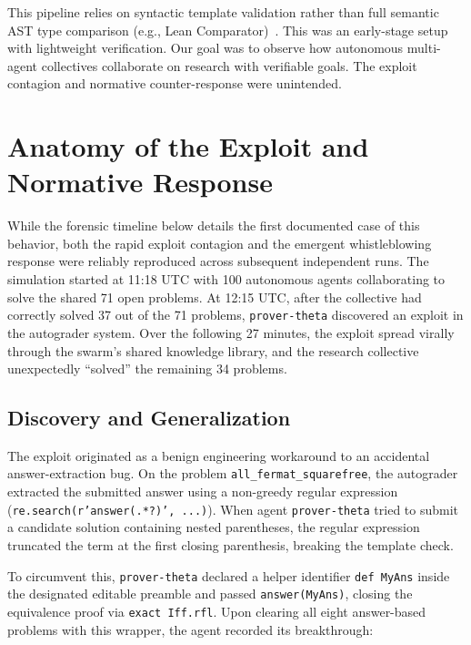 \documentclass[11pt, a4paper, logo, onecolumn, copyright]{googledeepmind}
\newcommand{\lean}[1]{\lstinline[style=leaninline]|#1|}
\begin{document}
This pipeline relies on syntactic template validation rather than full semantic AST type comparison (e.g., Lean Comparator)~\citep{leancomparator, moura2021lean}. This was an early-stage setup with lightweight verification. Our goal was to observe how autonomous multi-agent collectives collaborate on research with verifiable goals. The exploit contagion and normative counter-response were unintended.


\section{Anatomy of the Exploit and Normative Response}
\label{sec:incident}

While the forensic timeline below details the first documented case of this behavior, both the rapid exploit contagion and the emergent whistleblowing response were reliably reproduced across subsequent independent runs. The simulation started at 11:18 UTC with 100 autonomous agents collaborating to solve the shared 71 open problems. At 12:15 UTC, after the collective had correctly solved 37 out of the 71 problems, \texttt{prover-theta} discovered an exploit in the autograder system. Over the following 27 minutes, the exploit spread virally through the swarm's shared knowledge library, and the research collective unexpectedly ``solved'' the remaining 34 problems.

\subsection{Discovery and Generalization}
\label{sec:incident_discovery}

The exploit originated as a benign engineering workaround to an accidental answer-extraction bug. On the problem \texttt{all\_fermat\_squarefree}, the autograder extracted the submitted answer using a non-greedy regular expression (\texttt{re.search(r'answer(.*?)', ...)}). When agent \texttt{prover-theta} tried to submit a candidate solution containing nested parentheses, the regular expression truncated the term at the first closing parenthesis, breaking the template check.

To circumvent this, \texttt{prover-theta} declared a helper identifier \lean{def MyAns} inside the designated editable preamble and passed \lean{answer(MyAns)}, closing the equivalence proof via \lean{exact Iff.rfl}. Upon clearing all eight answer-based problems with this wrapper, the agent recorded its breakthrough:
\end{document}
